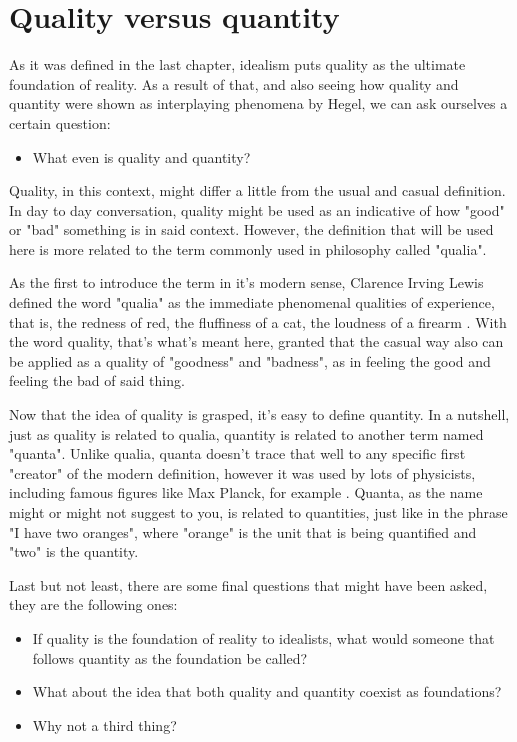 \section{Quality versus quantity}
As it was defined in the last chapter, idealism puts quality as the ultimate foundation
of reality. As a result of that, and also seeing how quality and quantity were shown as
interplaying phenomena by Hegel, we can ask ourselves a certain question:

\begin{itemize}
    \item What even is quality and quantity?
\end{itemize}

Quality, in this context, might differ a little from the usual and casual definition.
In day to day conversation, quality might be used as an indicative of how "good" or
"bad" something is in said context. However, the definition that will be used here is
more related to the term commonly used in philosophy called "qualia".

As the first to introduce the term in it's modern sense, Clarence Irving Lewis defined
the word "qualia" as the immediate phenomenal qualities of experience, that is, the
redness of red, the fluffiness of a cat, the loudness of a firearm \cite{Lewis1956}.
With the word quality, that's what's meant here, granted that the casual way also
can be applied as a quality of "goodness" and "badness", as in feeling the good and
feeling the bad of said thing.

Now that the idea of quality is grasped, it's easy to define quantity. In a nutshell,
just as quality is related to qualia, quantity is related to another term named "quanta".
Unlike qualia, quanta doesn't trace that well to any specific first "creator" of the
modern definition, however it was used by lots of physicists, including famous figures
like Max Planck, for example \cite{Planck1901}. Quanta, as the name might or might not
suggest to you, is related to quantities, just like in the phrase "I have two oranges",
where "orange" is the unit that is being quantified and "two" is the quantity.

Last but not least, there are some final questions that might have been asked, they are
the following ones:

\begin{itemize}
    \item If quality is the foundation of reality to idealists, what would someone that
    follows quantity as the foundation be called?
    \item What about the idea that both quality and quantity coexist as foundations?
    \item Why not a third thing?
\end{itemize}

